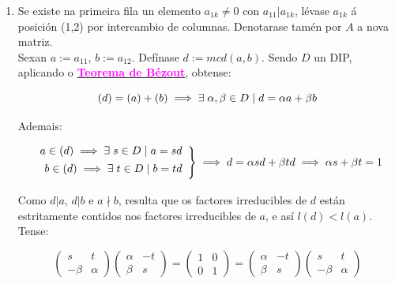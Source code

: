 \documentclass[twoside]{report}
\newcommand{\magbf}[1]{\textcolor{magenta}{\textbf{#1}}} %
\theoremstyle{mystyle}
\begin{document}
\begin{enumerate}
    \item Se existe na primeira fila un elemento $a_{1k} \neq 0$ con $a_{11} | a_{1k}$, lévase $a_{1k}$ á posición (1,2) por intercambio de columnas. Denotarase tamén por $A$ a nova matriz.\\
    
    Sexan $a := a_{11}$, $b := a_{12}$. Defínase $d := mcd(a,b)$. Sendo $D$ un DIP, aplicando o \hyperref[lem2.2]{\magbf{Teorema de Bézout}}, obtense:
    
    $$(d) = (a) + (b) \implies \exists \hspace{1mm} \alpha, \beta \in D \hspace{1mm} | \hspace{1mm} d = \alpha a + \beta b$$
    
    Ademais:
    
    \[ 
    \left. \begin{array}{r} 
    a \in (d) \implies \exists \hspace{1mm} s \in D \hspace{1mm} | \hspace{1mm} a = sd \\[1ex]
    b \in (d) \implies \exists \hspace{1mm} t \in D \hspace{1mm} | \hspace{1mm} b = td \\[1ex]
    \end{array} \right\} 
    \implies d = \alpha sd + \beta td \implies \alpha s + \beta t = 1
    \]
    
    Como $d | a$, $d | b$ e $a \nmid b$, resulta que os factores irreducibles de $d$ están estritamente contidos nos factores irreducibles de $a$, e así $l(d) < l(a)$. \\
    
    Tense:
    
    $$
    \begin{pmatrix}
    s & t \\
    -\beta & \alpha
    \end{pmatrix}
    \begin{pmatrix}
    \alpha & -t\\
    \beta & s
    \end{pmatrix}
    = 
    \begin{pmatrix}
    1 & 0\\
    0 & 1
    \end{pmatrix}
    =
    \begin{pmatrix}
    \alpha & -t \\
    \beta & s
    \end{pmatrix}
    \begin{pmatrix}
    s & t\\
    -\beta & \alpha
    \end{pmatrix}
    $$
    

\end{enumerate}
\end{document}

